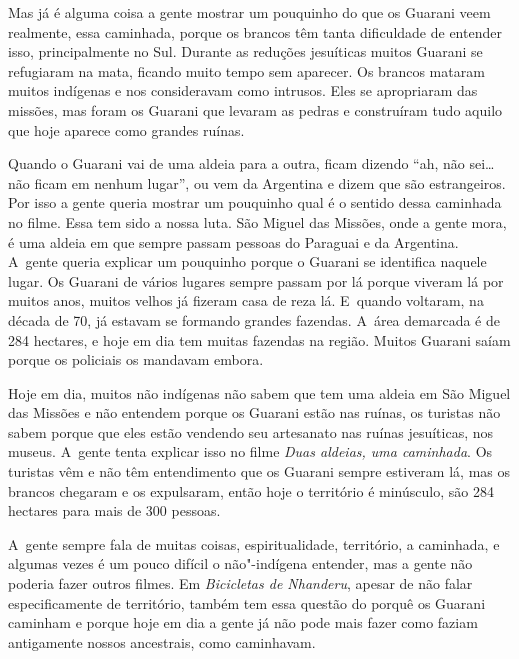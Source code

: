 Mas já é alguma coisa a gente mostrar um pouquinho do que os Guarani
veem realmente, essa caminhada, porque os brancos têm tanta dificuldade
de entender isso, principalmente no Sul. Durante as reduções jesuíticas
muitos Guarani se refugiaram na mata, ficando muito tempo sem
aparecer. Os brancos mataram muitos indígenas e nos consideravam como
intrusos. Eles se apropriaram das missões, mas foram os Guarani que
levaram as pedras e construíram tudo aquilo que hoje aparece como
grandes ruínas.

Quando o Guarani vai de uma aldeia para a outra, ficam dizendo ``ah, não
sei\ldots{} não ficam em nenhum lugar'', ou vem da Argentina e dizem que são
estrangeiros. Por isso a gente queria mostrar um pouquinho qual é o
sentido dessa caminhada no filme. Essa tem sido a nossa luta. São
Miguel das Missões, onde a gente mora, é uma aldeia em que sempre
passam pessoas do Paraguai e da Argentina. A~gente queria explicar um
pouquinho porque o Guarani se identifica naquele lugar. Os Guarani de
vários lugares sempre passam por lá porque viveram lá por muitos anos,
muitos velhos já fizeram casa de reza lá. E~quando voltaram, na década
de 70, já estavam se formando grandes fazendas. A~área demarcada é de
284 hectares, e hoje em dia tem muitas fazendas na região. Muitos
Guarani saíam porque os policiais os mandavam embora.

Hoje em dia, muitos não indígenas não sabem que tem uma aldeia em São
Miguel das Missões e não entendem porque os Guarani estão nas ruínas,
os turistas não sabem porque que eles estão vendendo seu artesanato nas
ruínas jesuíticas, nos museus. A~gente tenta explicar isso no filme
\emph{Duas aldeias, uma caminhada}. Os turistas vêm e não têm entendimento que
os Guarani sempre estiveram lá, mas os brancos chegaram e os
expulsaram, então hoje o território é minúsculo, são 284 hectares para
mais de 300 pessoas.

A~gente sempre fala de muitas coisas, espiritualidade, território, a
caminhada, e algumas vezes é um pouco difícil o não"-indígena entender,
mas a gente não poderia fazer outros filmes. Em \emph{Bicicletas de Nhanderu},
apesar de não falar especificamente de território, também tem essa
questão do porquê os Guarani caminham e porque hoje em dia a gente já
não pode mais fazer como faziam antigamente nossos ancestrais, como
caminhavam.

